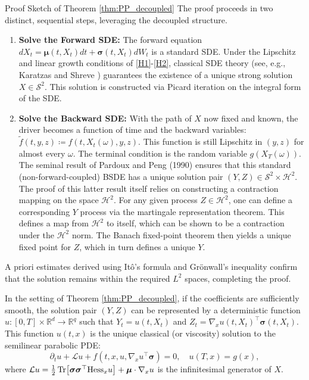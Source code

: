 \begin{leanproofbox}{Proof Sketch of Theorem \ref{thm:PP_decoupled}}
The proof proceeds in two distinct, sequential steps, leveraging the decoupled structure.
\begin{enumerate}
    \item \textbf{Solve the Forward SDE:} The forward equation \(dX_t = \bm\mu(t,X_t)dt + \bm\sigma(t,X_t)dW_t\) is a standard SDE. Under the Lipschitz and linear growth conditions of \ref{H1}-\ref{H2}, classical SDE theory (see, e.g., Karatzas and Shreve \cite{KaratzasShreve1991}) guarantees the existence of a unique strong solution \(X \in \mathcal S^2\). This solution is constructed via Picard iteration on the integral form of the SDE.
    \item \textbf{Solve the Backward SDE:} With the path of \(X\) now fixed and known, the driver becomes a function of time and the backward variables: \(\tilde{f}(t,y,z) \coloneqq f(t,X_t(\omega),y,z)\). This function is still Lipschitz in \((y,z)\) for almost every \(\omega\). The terminal condition is the random variable \(g(X_T(\omega))\). The seminal result of Pardoux and Peng (1990) \cite{PardouxPeng1990} ensures that this standard (non-forward-coupled) BSDE has a unique solution pair \((Y,Z) \in \mathcal S^2 \times \mathcal H^2\). The proof of this latter result itself relies on constructing a contraction mapping on the space \(\mathcal{H}^2\). For any given process \(Z \in \mathcal{H}^2\), one can define a corresponding \(Y\) process via the martingale representation theorem. This defines a map from \(\mathcal{H}^2\) to itself, which can be shown to be a contraction under the \(\mathcal{H}^2\) norm. The Banach fixed-point theorem then yields a unique fixed point for \(Z\), which in turn defines a unique \(Y\).
\end{enumerate}
A priori estimates derived using Itô's formula and Grönwall's inequality confirm that the solution remains within the required \(L^2\) spaces, completing the proof.
\end{leanproofbox}

\begin{proposition}
\label{prop:feynman_kac}
In the setting of Theorem \ref{thm:PP_decoupled}, if the coefficients are sufficiently smooth, the solution pair \((Y,Z)\) can be represented by a deterministic function \(u: [0,T] \times \mathbb{R}^d \to \mathbb{R}^q\) such that \(Y_t = u(t,X_t)\) and \(Z_t = \nabla_x u(t,X_t)^\top \bm\sigma(t,X_t)\). This function \(u(t,x)\) is the unique classical (or viscosity) solution to the semilinear parabolic PDE:
\[
\partial_t u + \mathcal L u + f(t,x,u,\nabla_x u^\top \bm\sigma)=0, \quad u(T,x) = g(x),
\]
where \(\mathcal{L}u = \frac{1}{2}\Tr[\bm\sigma\bm\sigma^\top \mathrm{Hess}_x u] + \bm\mu \cdot \nabla_x u\) is the infinitesimal generator of \(X\).
\end{proposition}


